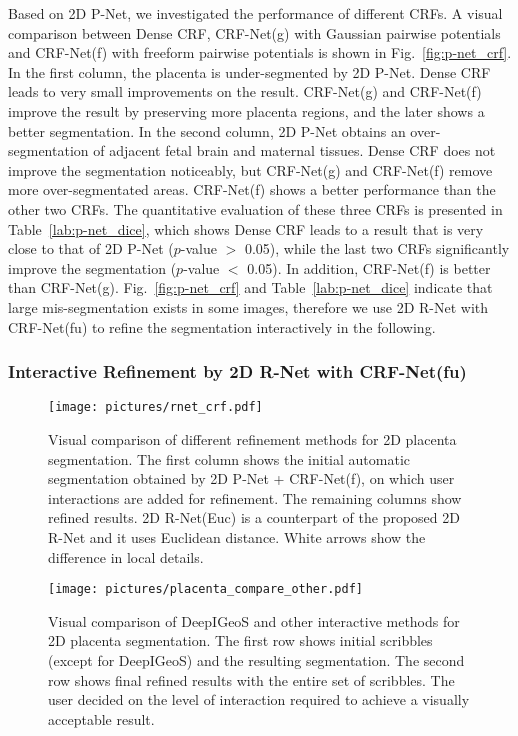\documentclass[10pt,journal,compsoc]{IEEEtran}
\begin{document}
Based on 2D P-Net, we investigated the performance of different CRFs. A visual comparison between Dense CRF, CRF-Net(g) with Gaussian pairwise potentials and CRF-Net(f) with freeform pairwise potentials is shown in Fig.~\ref{fig:p-net_crf}. In the first column, the placenta is under-segmented by 2D P-Net. Dense CRF leads to very small improvements on the result. CRF-Net(g) and CRF-Net(f) improve the result by preserving more placenta regions, and the later shows a better segmentation. In the second column, 2D P-Net obtains an over-segmentation of adjacent fetal brain and maternal tissues. Dense CRF does not improve the segmentation noticeably, but CRF-Net(g) and CRF-Net(f) remove more over-segmentated areas. CRF-Net(f) shows a better performance than the other two CRFs. The quantitative evaluation of these three CRFs is presented in Table~\ref{lab:p-net_dice}, which shows Dense CRF leads to a result that is very close to that of 2D P-Net ($p$-value $>$ 0.05), while the last two CRFs significantly improve the segmentation ($p$-value $<$ 0.05). In addition, CRF-Net(f) is better than CRF-Net(g). %
Fig.~\ref{fig:p-net_crf} and Table~\ref{lab:p-net_dice} indicate that large mis-segmentation exists in some images, therefore we use 2D R-Net with CRF-Net(fu) to refine the segmentation interactively in the following.

\subsubsection{Interactive Refinement by 2D R-Net with CRF-Net(fu) }

\begin{figure*}[t]
	\centering
	\texttt{[image: pictures/rnet\_crf.pdf]}
	\caption[Visual comparison of different refinement methods for 2D placenta segmentation.]{ 
		Visual comparison of different refinement methods for 2D placenta segmentation. The first column shows the initial automatic segmentation obtained by 2D P-Net + CRF-Net(f), on which user interactions are added for refinement. The remaining columns show refined results. 2D R-Net(Euc) is a counterpart of the proposed 2D R-Net and it uses Euclidean distance. White arrows show the difference in local details.} 
	\label{fig:r_net_crf}
\end{figure*}

\begin{figure*}[t]
	\centering
	\texttt{[image: pictures/placenta\_compare\_other.pdf]}
	\caption[Visual comparison of DeepIGeoS and other interactive methods for 2D placenta segmentation.]{ 
		Visual comparison of DeepIGeoS and other interactive methods for 2D placenta segmentation. 
		The first row shows initial scribbles (except for DeepIGeoS) and the resulting segmentation. The second row shows final refined results with the entire set of scribbles. The user decided on the level of interaction required to achieve a visually acceptable result. } 
	\label{fig:compare_interactive_placenta}
\end{figure*}
\end{document}
